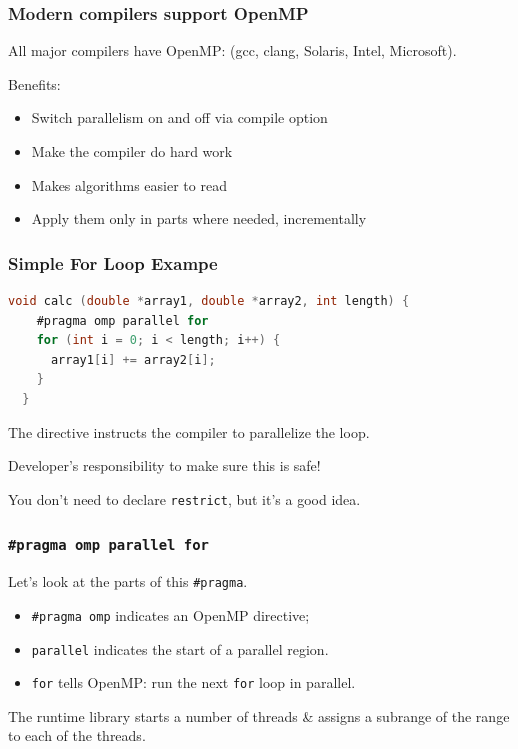 \begin{frame}[containsverbatim]
  \frametitle{Modern compilers support OpenMP}

All major compilers have OpenMP: (gcc, clang, Solaris, Intel, Microsoft).

Benefits:
\begin{itemize}
	\item Switch parallelism on and off via compile option
	\item Make the compiler do hard work
	\item Makes algorithms easier to read
	\item Apply them only in parts where needed, incrementally
\end{itemize}

\end{frame}



\begin{frame}[fragile]
\frametitle{Simple For Loop Exampe}

\begin{lstlisting}[language=C,morekeywords={foreach,pragma,omp,parallel,single,nowait,task,untied,barrier,taskyield}]
  void calc (double *array1, double *array2, int length) {
    #pragma omp parallel for
    for (int i = 0; i < length; i++) {
      array1[i] += array2[i];
    }
  }
\end{lstlisting}

The directive instructs the compiler to parallelize the loop.

Developer's responsibility to make sure this is safe!

You don't need to declare {\tt restrict}, but it's a good idea.

\end{frame}


\begin{frame}[containsverbatim]
  \frametitle{{\tt \#pragma omp parallel for}}

  Let's look at the parts of this \verb+#pragma+.\\[1em]

  \begin{itemize}
    \item \verb+#pragma omp+ indicates an OpenMP directive;
    \vfill
    \item {\tt parallel} indicates the start of a parallel region.
    \vfill
    \item {\tt for} tells OpenMP: run the next {\tt for} loop in parallel.
  \end{itemize}


The runtime library starts
  a number of threads \&  assigns a subrange of the range to 
  each of the threads.


\end{frame}

